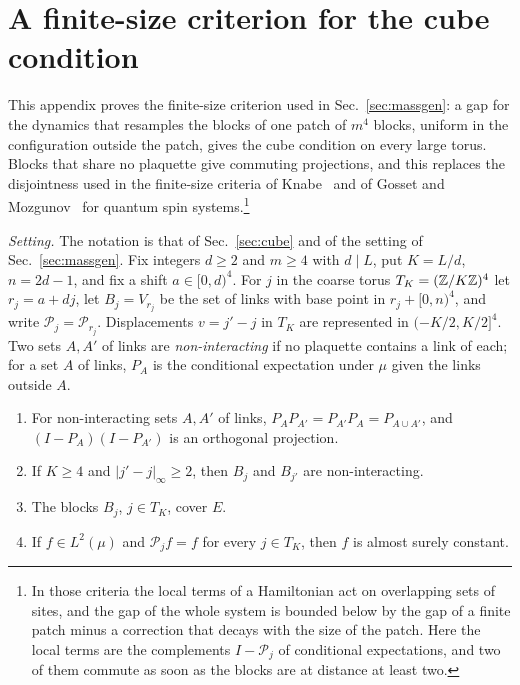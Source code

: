 \section{A finite-size criterion for the cube condition}\label{app:finite}

This appendix proves the finite-size criterion used in
Sec.~\ref{sec:massgen}: a gap for the dynamics that resamples the blocks of
one patch of $m^4$ blocks, uniform in the configuration outside the patch,
gives the cube condition on every large torus. Blocks that share no
plaquette give commuting projections, and this replaces the disjointness
used in the finite-size criteria of Knabe~\cite{Kna88} and of Gosset and
Mozgunov~\cite{GM16} for quantum spin systems.\footnote{In those criteria
the local terms of a Hamiltonian act on overlapping sets of sites, and the
gap of the whole system is bounded below by the gap of a finite patch minus
a correction that decays with the size of the patch. Here the local terms
are the complements $I-\mathcal P_j$ of conditional expectations, and two
of them commute as soon as the blocks are at distance at least two.}

\emph{Setting.} The notation is that of Sec.~\ref{sec:cube} and of the
setting of Sec.~\ref{sec:massgen}. Fix integers $d\ge2$ and $m\ge4$ with
$d\mid L$, put $K=L/d$, $n=2d-1$, and fix a shift $a\in[0,d)^4$. For $j$ in
the coarse torus $T_K=(\mathbb{Z}/K\mathbb{Z})^4$ let $r_j=a+dj$, let $B_j=V_{r_j}$ be the
set of links with base point in $r_j+[0,n)^4$, and write $\mathcal P_j=
\mathcal P_{r_j}$. Displacements $v=j'-j$ in $T_K$ are represented in
$(-K/2,K/2]^4$. Two sets $A,A'$ of links are \emph{non-interacting} if no
plaquette contains a link of each; for a set $A$ of links, $P_A$ is the
conditional expectation under $\mu$ given the links outside $A$.

\begin{lemma}\label{lem:fcommute}
\begin{enumerate}[label=\textup{(\roman*)},leftmargin=*]
\item For non-interacting sets $A,A'$ of links, $P_AP_{A'}=P_{A'}P_A=
P_{A\cup A'}$, and $(I-P_A)(I-P_{A'})$ is an orthogonal projection.
\item If $K\ge4$ and $|j'-j|_\infty\ge2$, then $B_j$ and $B_{j'}$ are
non-interacting.
\item The blocks $B_j$, $j\in T_K$, cover $E$.
\item If $f\in L^2(\mu)$ and $\mathcal P_jf=f$ for every $j\in T_K$, then
$f$ is almost surely constant.
\end{enumerate}
\end{lemma}

